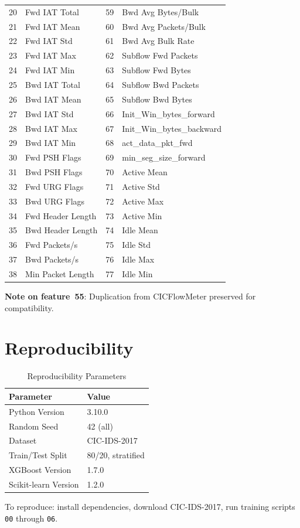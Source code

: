 \documentclass[12pt,a4paper]{article}
\begin{document}
\begin{longtable}{|r|l|r|l|}
20 & Fwd IAT Total & 59 & Bwd Avg Bytes/Bulk \\
21 & Fwd IAT Mean & 60 & Bwd Avg Packets/Bulk \\
22 & Fwd IAT Std & 61 & Bwd Avg Bulk Rate \\
23 & Fwd IAT Max & 62 & Subflow Fwd Packets \\
24 & Fwd IAT Min & 63 & Subflow Fwd Bytes \\
25 & Bwd IAT Total & 64 & Subflow Bwd Packets \\
26 & Bwd IAT Mean & 65 & Subflow Bwd Bytes \\
27 & Bwd IAT Std & 66 & Init\_Win\_bytes\_forward \\
28 & Bwd IAT Max & 67 & Init\_Win\_bytes\_backward \\
29 & Bwd IAT Min & 68 & act\_data\_pkt\_fwd \\
30 & Fwd PSH Flags & 69 & min\_seg\_size\_forward \\
31 & Bwd PSH Flags & 70 & Active Mean \\
32 & Fwd URG Flags & 71 & Active Std \\
33 & Bwd URG Flags & 72 & Active Max \\
34 & Fwd Header Length & 73 & Active Min \\
35 & Bwd Header Length & 74 & Idle Mean \\
36 & Fwd Packets/s & 75 & Idle Std \\
37 & Bwd Packets/s & 76 & Idle Max \\
38 & Min Packet Length & 77 & Idle Min \\
\hline
\end{longtable}
\noindent\textbf{Note on feature~55}: Duplication from CICFlowMeter preserved for compatibility.

\section{Reproducibility}
\begin{table}[H]
\centering
\caption{Reproducibility Parameters}
\label{app:reproducibility}
\begin{tabular}{|l|l|}
\hline
\textbf{Parameter} & \textbf{Value} \\
\hline
Python Version & 3.10.0 \\
Random Seed & 42 (all) \\
Dataset & CIC-IDS-2017 \\
Train/Test Split & 80/20, stratified \\
XGBoost Version & 1.7.0 \\
Scikit-learn Version & 1.2.0 \\
\hline
\end{tabular}
\end{table}
To reproduce: install dependencies, download CIC-IDS-2017, run training scripts \texttt{00} through \texttt{06}.
\end{document}
